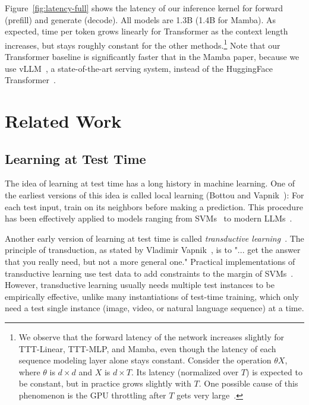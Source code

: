 \documentclass{article}
\begin{document}
Figure~\ref{fig:latency-full} shows the latency of our inference kernel for forward (prefill) and generate (decode). 
All models are 1.3B (1.4B for Mamba).
As expected, time per token grows linearly for Transformer as the context length increases, but stays roughly constant for the other methods.\footnote{\label{footnote:15}
We observe that the forward latency of the network increases slightly for TTT-Linear, TTT-MLP, and Mamba, even though the latency of each sequence modeling layer alone stays constant.
Consider the operation $\theta X$, where $\theta$ is $d\times d$ and $X$ is $d\times T$.
Its latency (normalized over $T$) is expected to be constant, but in practice grows slightly with $T$.
One possible cause of this phenomenon is the GPU throttling after $T$ gets very large~\cite{horace2024}.
}
Note that our Transformer baseline is significantly faster that in the Mamba paper, because we use vLLM~\cite{kwon2023efficient}, a state-of-the-art serving system, instead of the HuggingFace Transformer~\cite{wolf2019huggingface}.

\section{Related Work}
\label{sec:rel}

\subsection{Learning at Test Time}
\label{subsec:rel-ttt}

The idea of learning at test time has a long history in machine learning.
One of the earliest versions of this idea is called local learning (Bottou and Vapnik~\cite{bottou1992local}):
For each test input, train on its neighbors before making a prediction.
This procedure has been effectively applied to models ranging from SVMs~\cite{zhang2006svm} to modern LLMs~\cite{hardt2023test}.

Another early version of learning at test time is called \emph{transductive learning}~\cite{Gammerman98learningby}.
The principle of transduction, as stated by Vladimir Vapnik~\cite{vapnik2013nature}, is to
"... get the answer that you really need, but not a more general one."
Practical implementations of transductive learning use test data to add constraints to the margin of SVMs~\cite{joachims2002learning, collobert2006large}.
However, transductive learning usually needs multiple test instances to be empirically effective, unlike many instantiations of test-time training, which only need a test single instance (image, video, or natural language sequence) at a time.
\end{document}
